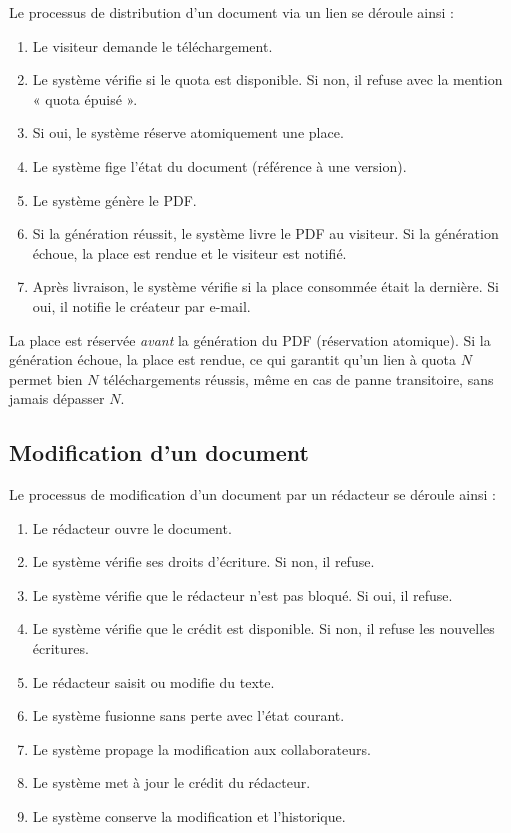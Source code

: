 Le processus de distribution d'un document via un lien se déroule ainsi :

\begin{enumerate}
    \item Le visiteur demande le téléchargement.
    \item Le système vérifie si le quota est disponible. Si non, il refuse avec la mention « quota épuisé ».
    \item Si oui, le système réserve atomiquement une place.
    \item Le système fige l'état du document (référence à une version).
    \item Le système génère le PDF.
    \item Si la génération réussit, le système livre le PDF au visiteur. Si la génération échoue, la place est rendue et le visiteur est notifié.
    \item Après livraison, le système vérifie si la place consommée était la dernière. Si oui, il notifie le créateur par e-mail.
\end{enumerate}

\begin{infobox}
La place est réservée \emph{avant} la génération du PDF (réservation atomique). Si la génération échoue, la place est rendue, ce qui garantit qu'un lien à quota $N$ permet bien $N$ téléchargements réussis, même en cas de panne transitoire, sans jamais dépasser $N$.
\end{infobox}

\subsection{Modification d'un document}

Le processus de modification d'un document par un rédacteur se déroule ainsi :

\begin{enumerate}
    \item Le rédacteur ouvre le document.
    \item Le système vérifie ses droits d'écriture. Si non, il refuse.
    \item Le système vérifie que le rédacteur n'est pas bloqué. Si oui, il refuse.
    \item Le système vérifie que le crédit est disponible. Si non, il refuse les nouvelles écritures.
    \item Le rédacteur saisit ou modifie du texte.
    \item Le système fusionne sans perte avec l'état courant.
    \item Le système propage la modification aux collaborateurs.
    \item Le système met à jour le crédit du rédacteur.
    \item Le système conserve la modification et l'historique.
\end{enumerate}

